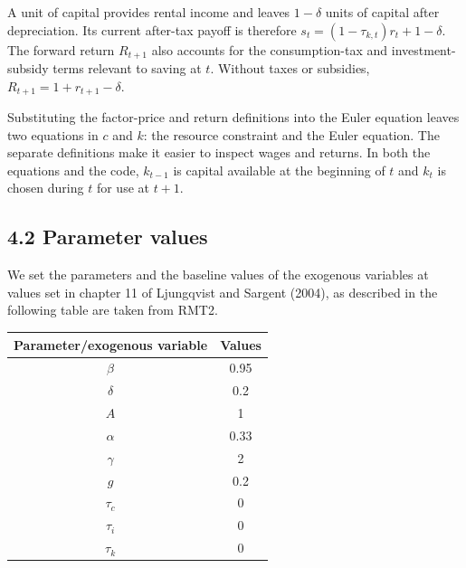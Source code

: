 \documentclass[12pt]{article}
\begin{document}
A unit of capital provides rental income and leaves $1-\delta$ units of capital after depreciation. Its current after-tax payoff is therefore $s_t=(1-\tau_{k,t})r_t+1-\delta$. The forward return $R_{t+1}$ also accounts for the consumption-tax and investment-subsidy terms relevant to saving at $t$. Without taxes or subsidies, $R_{t+1}=1+r_{t+1}-\delta$.

Substituting the factor-price and return definitions into the Euler equation leaves two equations in $c$ and $k$: the resource constraint and the Euler equation. The separate definitions make it easier to inspect wages and returns. In both the equations and the code, $k_{t-1}$ is capital available at the beginning of $t$ and $k_t$ is chosen during $t$ for use at $t+1$.

\subsection*{4.2 Parameter values}
We set the parameters and the baseline values of the exogenous variables at values set in chapter 11 of Ljungqvist and Sargent (2004), as described in the following table are taken from RMT2.

\begin{center}
\begin{tabular}{cc}
\hline
Parameter/exogenous variable & Values \\
\hline
$\beta$ & 0.95 \\
$\delta$ & 0.2 \\
$A$ & 1 \\
$\alpha$ & 0.33 \\
$\gamma$ & 2 \\
$g$ & 0.2 \\
$\tau_{c}$ & 0 \\
$\tau_{i}$ & 0 \\
$\tau_{k}$ & 0 \\
\hline
\end{tabular}
\captionsetup{labelformat=empty}
\captionsetup{hypcap=false}
\end{center}
\end{document}
